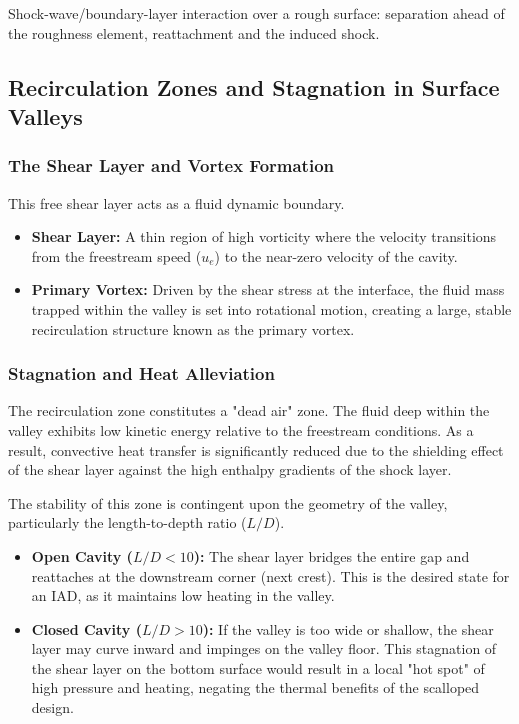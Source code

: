 Shock-wave/boundary-layer interaction over a rough surface: separation ahead of the roughness element, reattachment and the induced shock.


\subsection{Recirculation Zones and Stagnation in Surface Valleys}
\subsubsection*{The Shear Layer and Vortex Formation}
This free shear layer acts as a fluid dynamic boundary.
\begin{itemize}
    \item \textbf{Shear Layer:} A thin region of high vorticity where the velocity transitions from the freestream speed ($u_e$) to the near-zero velocity of the cavity.

    \item \textbf{Primary Vortex:} Driven by the shear stress at the interface, the fluid mass trapped within the valley is set into rotational motion, creating a large, stable recirculation structure known as the primary vortex.
\end{itemize}

\subsubsection*{Stagnation and Heat Alleviation}
The recirculation zone constitutes a "dead air" zone. The fluid deep within the valley exhibits low kinetic energy relative to the freestream conditions. As a result, convective heat transfer is significantly reduced due to the shielding effect of the shear layer against the high enthalpy gradients of the shock layer.

The stability of this zone is contingent upon the geometry of the valley, particularly the length-to-depth ratio ($L/D$).
\begin{itemize}
    \item \textbf{Open Cavity ($L/D < 10$):} The shear layer bridges the entire gap and reattaches at the downstream corner (next crest). This is the desired state for an IAD, as it maintains low heating in the valley.

    \item \textbf{Closed Cavity ($L/D > 10$):} If the valley is too wide or shallow, the shear layer may curve inward and impinges on the valley floor. This stagnation of the shear layer on the bottom surface would result in a local "hot spot" of high pressure and heating, negating the thermal benefits of the scalloped design.
\end{itemize}

